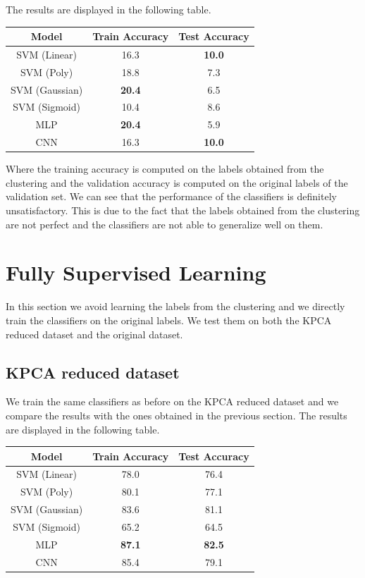 The results are displayed in the following table.
\begin{table}[H]
    \centering
    \begin{tabular}{|c|c|c|}
        \hline
        Model          & Train Accuracy & Test Accuracy \\
        \hline
        SVM (Linear)   & 16.3 & \textbf{10.0} \\
        SVM (Poly)     & 18.8 & 7.3 \\
        SVM (Gaussian) & \textbf{20.4} & 6.5 \\
        SVM (Sigmoid)  & 10.4 & 8.6 \\
        MLP            & \textbf{20.4} & 5.9 \\
        CNN            & 16.3 & \textbf{10.0} \\
        \hline
    \end{tabular}
\end{table}
Where the training accuracy is computed on the labels obtained from the
clustering and the validation accuracy is computed on the original labels of 
the validation set. We can see that the performance of the classifiers is
definitely unsatisfactory. This is due to the fact that the labels obtained
from the clustering are not perfect and the classifiers are not able to
generalize well on them.


\section{Fully Supervised Learning}

In this section we avoid learning the labels from the clustering and we
directly train the classifiers on the original labels. We test them on
both the KPCA reduced dataset and the original dataset.

\subsection{KPCA reduced dataset}
We train the same classifiers as before on the KPCA reduced dataset and
we compare the results with the ones obtained in the previous section.
The results are displayed in the following table.
\begin{table}[H]
    \centering
    \begin{tabular}{|c|c|c|}
        \hline
        Model          & Train Accuracy & Test Accuracy \\
        \hline
        SVM (Linear)   & 78.0 & 76.4 \\
        SVM (Poly)     & 80.1 & 77.1 \\
        SVM (Gaussian) & 83.6 & 81.1 \\
        SVM (Sigmoid)  & 65.2 & 64.5 \\
        MLP            & \textbf{87.1} & \textbf{82.5} \\
        CNN            & 85.4 & 79.1 \\
        \hline
    \end{tabular}
\end{table}

